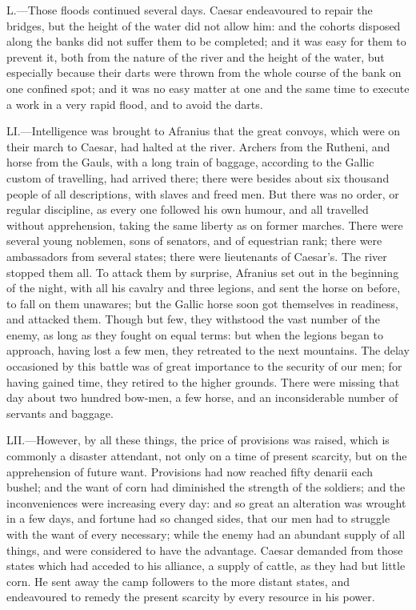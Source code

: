 L.—Those floods continued several days. Caesar endeavoured to repair
the bridges, but the height of the water did not allow him: and the
cohorts disposed along the banks did not suffer them to be completed;
and it was easy for them to prevent it, both from the nature of the
river and the height of the water, but especially because their darts
were thrown from the whole course of the bank on one confined spot; and
it was no easy matter at one and the same time to execute a work in a
very rapid flood, and to avoid the darts.

LI.—Intelligence was brought to Afranius that the great convoys, which
were on their march to Caesar, had halted at the river. Archers from the
Rutheni, and horse from the Gauls, with a long train of baggage,
according to the Gallic custom of travelling, had arrived there; there
were besides about six thousand people of all descriptions, with slaves
and freed men. But there was no order, or regular discipline, as every
one followed his own humour, and all travelled without apprehension,
taking the same liberty as on former marches. There were several young
noblemen, sons of senators, and of equestrian rank; there were
ambassadors from several states; there were lieutenants of Caesar's. The
river stopped them all. To attack them by surprise, Afranius set out in
the beginning of the night, with all his cavalry and three legions, and
sent the horse on before, to fall on them unawares; but the Gallic horse
soon got themselves in readiness, and attacked them. Though but few,
they withstood the vast number of the enemy, as long as they fought on
equal terms: but when the legions began to approach, having lost a few
men, they retreated to the next mountains. The delay occasioned by this
battle was of great importance to the security of our men; for having
gained time, they retired to the higher grounds. There were missing that
day about two hundred bow-men, a few horse, and an inconsiderable number
of servants and baggage.

LII.—However, by all these things, the price of provisions was raised,
which is commonly a disaster attendant, not only on a time of present
scarcity, but on the apprehension of future want. Provisions had now
reached fifty denarii each bushel; and the want of corn had diminished
the strength of the soldiers; and the inconveniences were increasing
every day: and so great an alteration was wrought in a few days, and
fortune had so changed sides, that our men had to struggle with the want
of every necessary; while the enemy had an abundant supply of all
things, and were considered to have the advantage. Caesar demanded from
those states which had acceded to his alliance, a supply of cattle, as
they had but little corn. He sent away the camp followers to the more
distant states, and endeavoured to remedy the present scarcity by every
resource in his power.

